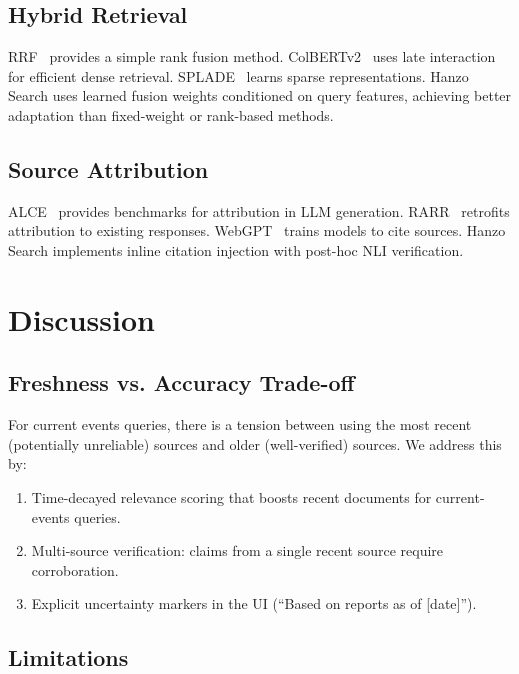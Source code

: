 \documentclass[11pt,twocolumn]{article}
\begin{document}
\subsection{Hybrid Retrieval}

RRF~\cite{cormack2009reciprocal} provides a simple rank fusion method. ColBERTv2~\cite{santhanam2022colbertv2} uses late interaction for efficient dense retrieval. SPLADE~\cite{formal2022splade} learns sparse representations. Hanzo Search uses learned fusion weights conditioned on query features, achieving better adaptation than fixed-weight or rank-based methods.

\subsection{Source Attribution}

ALCE~\cite{gao2023alce} provides benchmarks for attribution in LLM generation. RARR~\cite{gao2023rarr} retrofits attribution to existing responses. WebGPT~\cite{nakano2021webgpt} trains models to cite sources. Hanzo Search implements inline citation injection with post-hoc NLI verification.

\section{Discussion}
\label{sec:discussion}

\subsection{Freshness vs. Accuracy Trade-off}

For current events queries, there is a tension between using the most recent (potentially unreliable) sources and older (well-verified) sources. We address this by:
\begin{enumerate}[leftmargin=1.4em]
    \item Time-decayed relevance scoring that boosts recent documents for current-events queries.
    \item Multi-source verification: claims from a single recent source require corroboration.
    \item Explicit uncertainty markers in the UI (``Based on reports as of [date]'').
\end{enumerate}

\subsection{Limitations}
\end{document}
